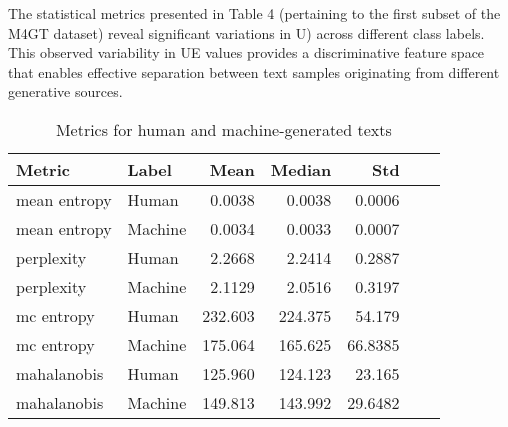\documentclass[a4paper, 12pt]{article}
\begin{document}
The statistical metrics presented in Table 4 (pertaining to the first subset of the M4GT dataset) reveal significant variations in U) across different class labels. This observed variability in UE values provides a discriminative feature space that enables effective separation between text samples originating from different generative sources.

\begin{table}[ht]
\centering
\begin{tabular}{llrrrrr}
\toprule
\textbf{Metric} & \textbf{Label} & \textbf{Mean} & \textbf{Median} & \textbf{Std}  \\
\midrule
mean entropy   & Human   & 0.0038   & 0.0038   & 0.0006    \\
mean entropy   & Machine   & 0.0034   & 0.0033   & 0.0007   \\
perplexity    & Human   & 2.2668   & 2.2414   & 0.2887   \\
perplexity    & Machine   & 2.1129   & 2.0516   & 0.3197  \\
mc entropy    & Human   & 232.603  & 224.375  & 54.179   \\
mc entropy    & Machine   & 175.064  & 165.625  & 66.8385  \\
mahalanobis   & Human   & 125.960  & 124.123  & 23.165  \\
mahalanobis   & Machine   & 149.813  & 143.992  & 29.6482   \\
\bottomrule
\end{tabular}
\caption{Metrics for human and machine-generated texts}
\label{tab:metric-by-label}
\end{table}
\end{document}
